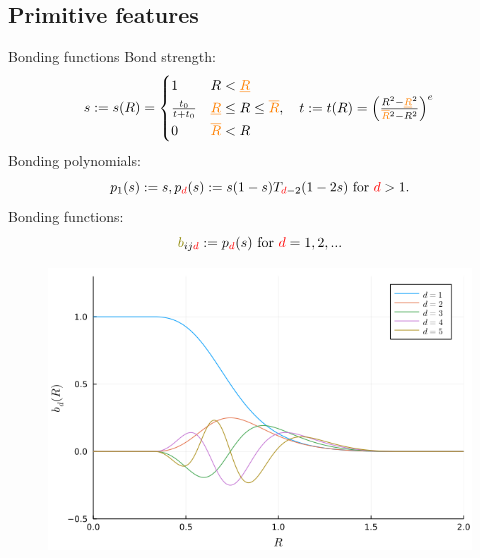 \documentclass{beamer}
\begin{document}
\subsection{Primitive features}
\begin{frame}{Bonding functions}
    \fontsize{6.5}{6}\selectfont
    Bond strength:
    \begin{equation}
         s := s(R) =
        \begin{cases}
            1 & R < {\color{orange}\underline{R}} \\
            \frac{t_0}{t + t_0} & {\color{orange}\underline{R}} \leq R \leq {\color{orange}\overline{R}}, \quad t := t(R) = \left(\frac{R^2 - {\color{orange}\underline{R}}^2}{{\color{orange}\overline{R}}^2 - R^2}\right)^e \\
            0 & {\color{orange}\overline{R}} < R
        \end{cases}
    \end{equation}
    Bonding polynomials:
    \begin{equation}
        p_1(s) := s, p_{\color{red}d}(s):= s(1-s)T_{{\color{red}d}-2}(1-2s) \text{ for } {\color{red}d} > 1.
    \end{equation}
    Bonding functions:
    \begin{equation}
        {\color{olive}b}_{ij{\color{red}d}} := p_{\color{red}d}(s)\text{ for }{\color{red}d}=1,2,...
    \end{equation}
    \begin{figure}[H]
        \centering
            \includegraphics[scale=0.33]{img/slide/bonding_functions.png}
        \label{fig:bonding_functions}
    \end{figure}
\end{frame}
\end{document}
